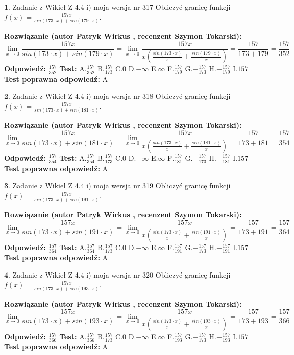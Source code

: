 \documentclass[12pt, a4paper]{article}
\theoremstyle{definition} %
\newtheorem{zad}{}
\newcommand{\zadStart}[1]{\begin{zad}#1\newline}
\newcommand{\zadStop}{\end{zad}}
\newcommand{\rozwStart}[2]{\noindent \textbf{Rozwiązanie (autor #1 , recenzent #2): }\newline}
\newcommand{\rozwStop}{\newline}
\newcommand{\odpStart}{\noindent \textbf{Odpowiedź:}\newline}
\newcommand{\odpStop}{\newline}
\newcommand{\testStart}{\noindent \textbf{Test:}\newline}
\newcommand{\testStop}{\newline}
\newcommand{\kluczStart}{\noindent \textbf{Test poprawna odpowiedź:}\newline}
\newcommand{\kluczStop}{\newline}
\begin{document}
\zadStart{Zadanie z Wikieł Z 4.4 i) moja wersja nr 317}
Obliczyć granicę funkcji $f(x)=\frac{157x}{sin(173\cdot x) +sin(179\cdot x)}$.
\zadStop
\rozwStart{Patryk Wirkus}{Szymon Tokarski}
$$\lim\limits_{x\to 0}\frac{157x}{sin(173\cdot x) +sin(179\cdot x)}=\lim\limits_{x\to 0}\frac{157x}{x(\frac{sin(173\cdot x)}{x}+\frac{sin(179\cdot x)}{x})}=\frac{157}{173+179} = \frac{157}{352}$$
\rozwStop
\odpStart
$\frac{157}{352}$
\odpStop
\testStart
A.$\frac{157}{352}$
B.$\frac{157}{173}$
C.$0$
D.$-\infty$
E.$\infty$
F.$\frac{157}{179}$
G.$-\frac{157}{173}$
H.$-\frac{157}{179}$
I.$157$
\testStop
\kluczStart
A
\kluczStop



\zadStart{Zadanie z Wikieł Z 4.4 i) moja wersja nr 318}
Obliczyć granicę funkcji $f(x)=\frac{157x}{sin(173\cdot x) +sin(181\cdot x)}$.
\zadStop
\rozwStart{Patryk Wirkus}{Szymon Tokarski}
$$\lim\limits_{x\to 0}\frac{157x}{sin(173\cdot x) +sin(181\cdot x)}=\lim\limits_{x\to 0}\frac{157x}{x(\frac{sin(173\cdot x)}{x}+\frac{sin(181\cdot x)}{x})}=\frac{157}{173+181} = \frac{157}{354}$$
\rozwStop
\odpStart
$\frac{157}{354}$
\odpStop
\testStart
A.$\frac{157}{354}$
B.$\frac{157}{173}$
C.$0$
D.$-\infty$
E.$\infty$
F.$\frac{157}{181}$
G.$-\frac{157}{173}$
H.$-\frac{157}{181}$
I.$157$
\testStop
\kluczStart
A
\kluczStop



\zadStart{Zadanie z Wikieł Z 4.4 i) moja wersja nr 319}
Obliczyć granicę funkcji $f(x)=\frac{157x}{sin(173\cdot x) +sin(191\cdot x)}$.
\zadStop
\rozwStart{Patryk Wirkus}{Szymon Tokarski}
$$\lim\limits_{x\to 0}\frac{157x}{sin(173\cdot x) +sin(191\cdot x)}=\lim\limits_{x\to 0}\frac{157x}{x(\frac{sin(173\cdot x)}{x}+\frac{sin(191\cdot x)}{x})}=\frac{157}{173+191} = \frac{157}{364}$$
\rozwStop
\odpStart
$\frac{157}{364}$
\odpStop
\testStart
A.$\frac{157}{364}$
B.$\frac{157}{173}$
C.$0$
D.$-\infty$
E.$\infty$
F.$\frac{157}{191}$
G.$-\frac{157}{173}$
H.$-\frac{157}{191}$
I.$157$
\testStop
\kluczStart
A
\kluczStop



\zadStart{Zadanie z Wikieł Z 4.4 i) moja wersja nr 320}
Obliczyć granicę funkcji $f(x)=\frac{157x}{sin(173\cdot x) +sin(193\cdot x)}$.
\zadStop
\rozwStart{Patryk Wirkus}{Szymon Tokarski}
$$\lim\limits_{x\to 0}\frac{157x}{sin(173\cdot x) +sin(193\cdot x)}=\lim\limits_{x\to 0}\frac{157x}{x(\frac{sin(173\cdot x)}{x}+\frac{sin(193\cdot x)}{x})}=\frac{157}{173+193} = \frac{157}{366}$$
\rozwStop
\odpStart
$\frac{157}{366}$
\odpStop
\testStart
A.$\frac{157}{366}$
B.$\frac{157}{173}$
C.$0$
D.$-\infty$
E.$\infty$
F.$\frac{157}{193}$
G.$-\frac{157}{173}$
H.$-\frac{157}{193}$
I.$157$
\testStop
\kluczStart
A
\kluczStop
\end{document}
